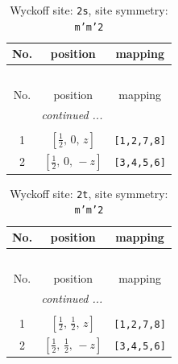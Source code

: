 \documentclass[fleqn,8pt]{jsarticle}
\begin{document}
\renewcommand{\arraystretch}{1.2}
\begin{longtable}{ccc}
\caption{Wyckoff site: {\tt 2s}, site symmetry: {\tt m'm'2}}
 \\
 \hline \hline
No. & position & mapping \\ \hline \endfirsthead

\multicolumn{2}{l}{\tablename\ \thetable{}} \\
 \hline \hline
No. & position & mapping \\ \hline \endhead

 \hline \hline
\multicolumn{2}{r}{\footnotesize\it continued ...} \\ \endfoot

 \hline \hline
\multicolumn{2}{r}{} \\ \endlastfoot

1 & $\left[ \frac{1}{2},\, 0,\, z \right]$ & {\tt [1,2,7,8]} \\ \hline
2 & $\left[ \frac{1}{2},\, 0,\, - z \right]$ & {\tt [3,4,5,6]} \\
\end{longtable}
\renewcommand{\arraystretch}{1.2}
\begin{longtable}{ccc}
\caption{Wyckoff site: {\tt 2t}, site symmetry: {\tt m'm'2}}
 \\
 \hline \hline
No. & position & mapping \\ \hline \endfirsthead

\multicolumn{2}{l}{\tablename\ \thetable{}} \\
 \hline \hline
No. & position & mapping \\ \hline \endhead

 \hline \hline
\multicolumn{2}{r}{\footnotesize\it continued ...} \\ \endfoot

 \hline \hline
\multicolumn{2}{r}{} \\ \endlastfoot

1 & $\left[ \frac{1}{2},\, \frac{1}{2},\, z \right]$ & {\tt [1,2,7,8]} \\ \hline
2 & $\left[ \frac{1}{2},\, \frac{1}{2},\, - z \right]$ & {\tt [3,4,5,6]} \\
\end{longtable}
\renewcommand{\arraystretch}{1.2}
\end{document}
